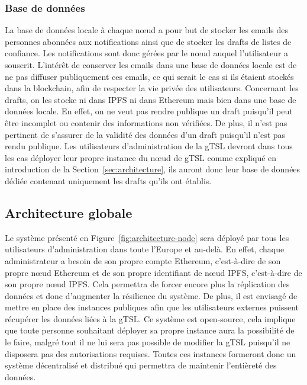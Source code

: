\documentclass{tnreport}
\begin{document}
\subsubsection{Base de données}

La base de données locale à chaque nœud a pour but de stocker les emails des personnes abonnées aux notifications ainsi que de stocker les drafts de listes de confiance. Les notifications sont donc gérées par le nœud auquel l'utilisateur a souscrit. L'intérêt de conserver les emails dans une base de données locale est de ne pas diffuser publiquement ces emails, ce qui serait le cas si ils étaient stockés dans la blockchain, afin de respecter la vie privée des utilisateurs. Concernant les drafts, on les stocke ni dans IPFS ni dans Ethereum mais bien dans une base de données locale. En effet, on ne veut pas rendre publique un draft puisqu'il peut être incomplet ou contenir des informations non vérifiées. De plus, il n'est pas pertinent de s'assurer de la validité des données d'un draft puisqu'il n'est pas rendu publique. Les utilisateurs d'administration de la gTSL devront dans tous les cas déployer leur propre instance du nœud de gTSL comme expliqué en introduction de la Section~\ref{sec:architecture}, ils auront donc leur base de données dédiée contenant uniquement les drafts qu'ils ont établis.

\subsection{Architecture globale}

Le système présenté en Figure~\ref{fig:architecture-node} sera déployé par tous les utilisateurs d'administration dans toute l'Europe et au-delà. En effet, chaque administrateur a besoin de son propre compte Ethereum, c'est-à-dire de son propre nœud Ethereum et de son propre identifiant de nœud IPFS, c'est-à-dire de son propre nœud IPFS. Cela permettra de forcer encore plus la réplication des données et donc d'augmenter la résilience du système. De plus, il est envisagé de mettre en place des instances publiques afin que les utilisateurs externes puissent récupérer les données liées à la gTSL. Ce système est open-source, cela implique que toute personne souhaitant déployer sa propre instance aura la possibilité de le faire, malgré tout il ne lui sera pas possible de modifier la gTSL puisqu'il ne disposera pas des autorisations requises. Toutes ces instances formeront donc un système décentralisé et distribué qui permettra de maintenir l'entièreté des données. 
\end{document}
